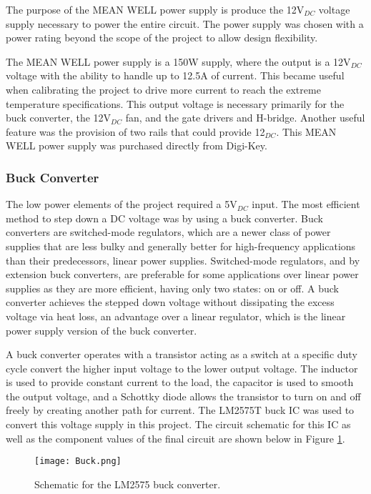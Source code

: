 \documentclass[11pt,letter]{article}
\begin{document}
The purpose of the MEAN WELL power supply is produce the 12V$_{DC}$ voltage supply necessary to power the entire circuit. The power supply was chosen with a power rating beyond the scope of the project to allow design flexibility.

The MEAN WELL power supply is a 150W supply, where the output is a 12V$_{DC}$ voltage with the ability to handle up to 12.5A of current. This became useful when calibrating the project to drive more current to reach the extreme temperature specifications. This output voltage is necessary primarily for the buck converter, the 12V$_{DC}$ fan, and the gate drivers and H-bridge. Another useful feature was the provision of two rails that could provide 12$_{DC}$. This MEAN WELL power supply was purchased directly from Digi-Key.

\subsubsection{Buck Converter}

The low power elements of the project required a 5V$_{DC}$ input. The most efficient method to step down a DC voltage was by using a buck converter. Buck converters are switched-mode regulators, which are a newer class of power supplies that are less bulky and generally better for high-frequency applications than their predecessors, linear power supplies. Switched-mode regulators, and by extension buck converters, are preferable for some applications over linear power supplies as they are more efficient, having only two states: on or off. A buck converter achieves the stepped down voltage without dissipating the excess voltage via heat loss, an advantage over a linear regulator, which is the linear power supply version of the buck converter. 

A buck converter operates with a transistor acting as a switch at a specific duty cycle convert the higher input voltage to the lower output voltage. The inductor is used to provide constant current to the load, the capacitor is used to smooth the output voltage, and a Schottky diode allows the transistor to turn on and off freely by creating another path for current. The LM2575T buck IC was used to convert this voltage supply in this project. The circuit schematic for this IC as well as the component values of the final circuit are shown below in Figure \ref{fig:buck}.

\begin{figure}[H]
    \centering
    \texttt{[image: Buck.png]}
    \caption{Schematic for the LM2575 buck converter.}
    \label{fig:buck}
\end{figure}
\end{document}
